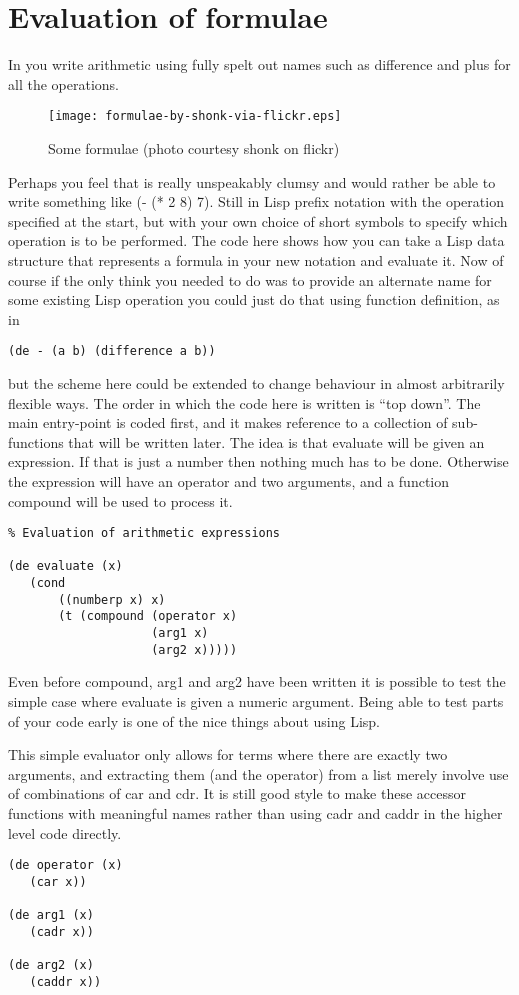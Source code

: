 \section{Evaluation of formulae}
In \vsl{} you write arithmetic using fully spelt out names such as
{\tx difference} and {\tx plus} for all the operations.
\begin{wrapfigure}{r}{2.5in}
{\centering
\texttt{[image: formulae-by-shonk-via-flickr.eps]}}
\caption{Some formulae (photo courtesy shonk on flickr)}
\end{wrapfigure} Perhaps
you feel that is really unspeakably clumsy and would rather be able
to write something like {\tx (- (* 2 8) 7)}. Still in Lisp prefix
notation with the operation specified at the start, but with your own
choice of short symbols to specify which operation is to be performed.
The code here shows how you can take a Lisp data structure that represents
a formula in your new notation and evaluate it. Now of course if the only
think you needed to do was to provide an alternate name for some existing
Lisp operation you could just do that using function definition, as in
{\small\begin{verbatim}
(de - (a b) (difference a b))
\end{verbatim}}
\noindent but the scheme here could be extended to change behaviour in
almost arbitrarily flexible ways. The order in which the code here is
written is ``top down''. The main entry-point is coded first, and it makes
reference to a collection of sub-functions that will be written later.
The idea is that {\tx evaluate} will be given an expression. If that
is just a number then nothing much has to be done. Otherwise the expression
will have an operator and two arguments, and a function {\tx compound}
will be used to process it.
{\small\begin{verbatim}
% Evaluation of arithmetic expressions

(de evaluate (x)
   (cond
       ((numberp x) x)
       (t (compound (operator x)
                    (arg1 x)
                    (arg2 x)))))
\end{verbatim}}
Even before {\tx compound}, {\tx arg1} and {\tx arg2}
have been written it is possible to test the simple case where {\tx
evaluate} is given a numeric argument. Being able to test parts of your code
early is one of the nice things about using Lisp.

This simple evaluator only allows for terms where there are exactly two
arguments, and extracting them (and the operator) from a list merely involve
use of combinations of {\tx car} and {\tx cdr}. It is still
good style to make these accessor functions with meaningful names rather
than using {\tx cadr} and {\tx caddr} in the higher level code
directly.
{\small\begin{verbatim}
(de operator (x)
   (car x))

(de arg1 (x)
   (cadr x))

(de arg2 (x)
   (caddr x))
\end{verbatim}}

